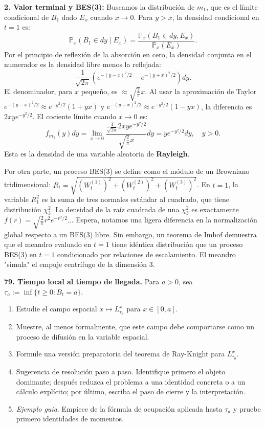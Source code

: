 \documentclass[11pt, letterpaper]{article}
\begin{document}
\begin{solucion}
    \textbf{2. Valor terminal y BES(3):}
    Buscamos la distribución de $m_1$, que es el límite condicional de $B_1$ dado $E_x$ cuando $x \to 0$.
    Para $y > x$, la densidad condicional en $t=1$ es:
    \[ \mathbb{P}_x(B_1 \in dy \mid E_x) = \frac{\mathbb{P}_x(B_1 \in dy, E_x)}{\mathbb{P}_x(E_x)}. \]
    Por el principio de reflexión de la absorción en cero, la densidad conjunta en el numerador es la densidad libre menos la reflejada:
    \[ \frac{1}{\sqrt{2\pi}} \left( e^{-(y-x)^2/2} - e^{-(y+x)^2/2} \right) dy. \]
    El denominador, para $x$ pequeño, es $\approx \sqrt{\frac{2}{\pi}} x$.
    Al usar la aproximación de Taylor $e^{-(y-x)^2/2} \approx e^{-y^2/2}(1+yx)$ y $e^{-(y+x)^2/2} \approx e^{-y^2/2}(1-yx)$, la diferencia es $2xy e^{-y^2/2}$.
    El cociente límite cuando $x \to 0$ es:
    \[ f_{m_1}(y) dy = \lim_{x \to 0} \frac{\frac{1}{\sqrt{2\pi}} 2xy e^{-y^2/2}}{\sqrt{\frac{2}{\pi}} x} dy = y e^{-y^2/2} dy, \quad y > 0. \]
    Esta es la densidad de una variable aleatoria de \textbf{Rayleigh}.
    
    Por otra parte, un proceso BES(3) se define como el módulo de un Browniano tridimensional: $R_t = \sqrt{(W_t^{(1)})^2 + (W_t^{(2)})^2 + (W_t^{(3)})^2}$.
    En $t=1$, la variable $R_1^2$ es la suma de tres normales estándar al cuadrado, que tiene distribución $\chi^2_3$.
    La densidad de la raíz cuadrada de una $\chi^2_3$ es exactamente $f(r) = \sqrt{\frac{2}{\pi}} r^2 e^{-r^2/2}$... Espera, notamos una ligera diferencia en la normalización global respecto a un BES(3) libre. Sin embargo, un teorema de Imhof demuestra que el meandro evaluado en $t=1$ tiene idéntica distribución que un proceso BES(3) en $t=1$ condicionado por relaciones de escalamiento. El meandro "simula" el empuje centrífugo de la dimensión 3.
\end{solucion}

\newpage

\begin{ejercicio}
    \textbf{79. Tiempo local al tiempo de llegada.} Para $a>0$, sea $\tau_{a}:=\inf\{t\ge 0:B_{t}=a\}$.
    \begin{enumerate}
        \item Estudie el campo espacial $x\mapsto L_{\tau_{a}}^{x}$ para $x\in[0,a]$.
        \item Muestre, al menos formalmente, que este campo debe comportarse como un proceso de difusión en la variable espacial.
        \item Formule una versión preparatoria del teorema de Ray-Knight para $L_{\tau_{a}}^{x}$.
        \item Sugerencia de resolución paso a paso. Identifique primero el objeto dominante; después reduzca el problema a una identidad concreta o a un cálculo explícito; por último, escriba el paso de cierre y la interpretación.
        \item \textit{Ejemplo guía}. Empiece de la fórmula de ocupación aplicada hasta $\tau_a$ y pruebe primero identidades de momentos.
    \end{enumerate}
\end{ejercicio}
\end{document}
